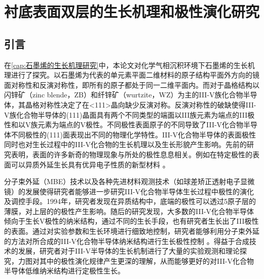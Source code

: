\chapter{衬底表面双层的生长机理和极性演化研究}
\label{cap:InSb}
\section{引言}

在\ref{cap:石墨烯的生长机理研究}中，本论文对化学气相沉积环境下石墨烯的生长机理进行了探究。以石墨烯为代表的单元素平面二维材料的原子结构平面外方向的镜面对称性和反演对称性，即所有的原子都处于同一二维平面内。而对于晶格结构以闪锌矿（zinc blende，ZB）和纤锌矿（wurtzite，WZ）为主的III-V族化合物半导体，其晶格对称性决定了在<111>晶向缺少反演对称。反演对称性的破缺使得III-V族化合物半导体的(111)晶面具有两个不同类型的端面\chinesecolon 以III族元素为端点的III极性和以V族元素为端点的V极性。不同极性表面原子的不同导致了III-V化合物半导体不同极性的(111)面表现出不同的物理化学特性。III-V化合物半导体的表面极性同时也对生长过程中的III-V化合物的生长机理以及生长形貌产生影响。先前的研究表明，表面的许多新奇的物理现象与所处的极性息息相关。例如在特定极性的表面可以异质外延生长具有优异电子性质的新型材料 。

分子束外延（MBE）技术以及各种先进材料观测技术（如球差矫正透射电子显微镜）的发展使得研究者能够进一步研究III-V化合物半导体生长过程中极性的演化及调控手段。1994年，研究者发现在异质结构中，底端的极性可以透过5原子层的薄膜，对上层的的极性产生影响。随后的研究发现，大多数的III-V化合物半导体倾向于生长V极性的纳米结构，通过不同的生长手段，也有研究者生长出了III极性的表面。通过对实验参数和生长环境进行细致地控制，研究者能够利用分子束外延的方法对所合成的III-V化合物半导体纳米结构进行生长极性控制 。得益于合成技术的发展，研究者对于III-V半导体的生长机制进行了大量的实验观测和理论探究，力图对其中的极性演化规律产生更深的理解，从而能够更好的对III-V化合物半导体低维纳米结构进行定极性生长。

